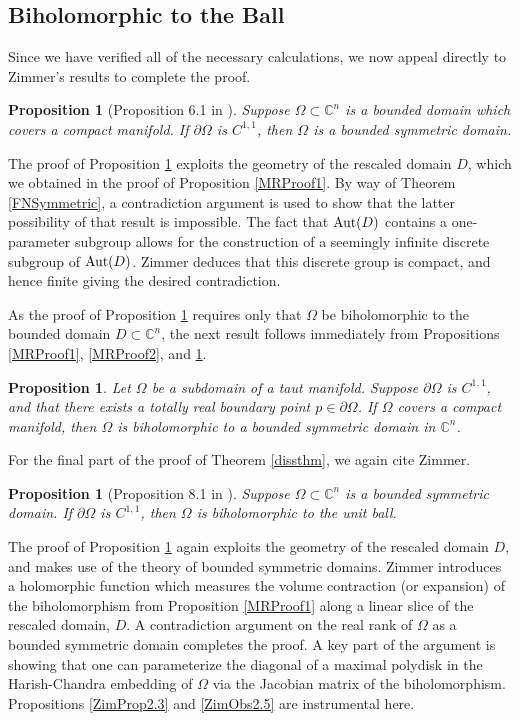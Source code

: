 \documentclass[12pt]{article}
\newcommand{\C}{\mathbb{C}}
\newcommand{\Aut}{\textup{Aut}}
\newtheorem{proposition}[lemma]{Proposition}
\begin{document}
\subsection{Biholomorphic to the Ball}

Since we have verified all of the necessary calculations, we now appeal directly to Zimmer's results to complete the proof.

\begin{proposition}[Proposition 6.1 in \cite{Zimmer}]
\label{ZimProp6.1}
Suppose $\Omega\subset\C^n$ is a bounded domain which covers a compact manifold. If $\partial\Omega$ is $C^{1,1}$, then $\Omega$ is a bounded symmetric domain.
\end{proposition}

The proof of Proposition \ref{ZimProp6.1} exploits the geometry of the rescaled domain $D$, which we obtained in the proof of Proposition \ref{MRProof1}. By way of Theorem \ref{FNSymmetric}, a contradiction argument is used to show that the latter possibility of that result is impossible. The fact that $\Aut(D)$ contains a one-parameter subgroup allows for the construction of a seemingly infinite discrete subgroup of $\Aut(D)$. Zimmer deduces that this discrete group is compact, and hence finite giving the desired contradiction.

As the proof of Proposition \ref{ZimProp6.1} requires only that $\Omega$ be biholomorphic to the bounded domain $D\subset\C^n$, the next result follows immediately from Propositions \ref{MRProof1}, \ref{MRProof2}, and \ref{ZimProp6.1}.

\begin{proposition}
\label{MRProof3}
Let $\Omega$ be a subdomain of a taut manifold. Suppose $\partial\Omega$ is $C^{1,1}$, and that there exists a totally real boundary point $p\in\partial\Omega$. If $\Omega$ covers a compact manifold, then $\Omega$ is biholomorphic to a bounded symmetric domain in $\C^n$.
\end{proposition}

For the final part of the proof of Theorem \ref{dissthm}, we again cite Zimmer.

\begin{proposition}[Proposition 8.1 in \cite{Zimmer}]
\label{MRProof4}
Suppose $\Omega\subset\C^n$ is a bounded symmetric domain. If $\partial\Omega$ is $C^{1,1}$, then $\Omega$ is biholomorphic to the unit ball.
\end{proposition}

The proof of Proposition \ref{MRProof4} again exploits the geometry of the rescaled domain $D$, and makes use of the theory of bounded symmetric domains. Zimmer introduces a holomorphic function which measures the volume contraction (or expansion) of the biholomorphism from Proposition \ref{MRProof1} along a linear slice of the rescaled domain, $D$. A contradiction argument on the real rank of $\Omega$ as a bounded symmetric domain completes the proof. A key part of the argument is showing that one can parameterize the diagonal of a maximal polydisk in the Harish-Chandra embedding of $\Omega$ via the Jacobian matrix of the biholomorphism. Propositions \ref{ZimProp2.3} and \ref{ZimObs2.5} are instrumental here.
\end{document}
